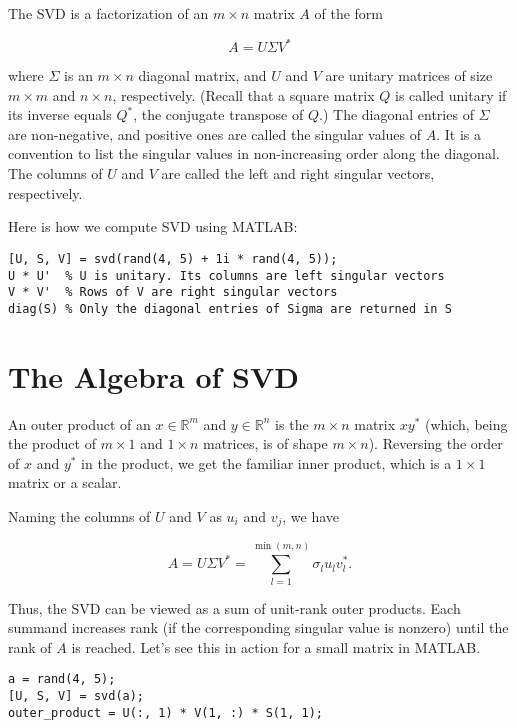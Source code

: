\documentclass{ximera}
\begin{document}
\begin{problem}
\begin{problem}
The SVD is a factorization of an \( m \times n \) matrix \( A \) of the form

\[
A = U \Sigma V^*
\]

where \( \Sigma \) is an \( m \times n \) diagonal matrix, and \( U \) and \( V \) are unitary matrices of size \( m \times m \) and \( n \times n \), respectively. (Recall that a square matrix \( Q \) is called unitary if its inverse equals \( Q^* \), the conjugate transpose of \( Q \).) The diagonal entries of \( \Sigma \) are non-negative, and positive ones are called the singular values of \( A \). It is a convention to list the singular values in non-increasing order along the diagonal. The columns of \( U \) and \( V \) are called the left and right singular vectors, respectively.

Here is how we compute SVD using MATLAB:

\begin{verbatim}
[U, S, V] = svd(rand(4, 5) + 1i * rand(4, 5));
U * U'  % U is unitary. Its columns are left singular vectors
V * V'  % Rows of V are right singular vectors
diag(S) % Only the diagonal entries of Sigma are returned in S
\end{verbatim}

\section{The Algebra of SVD}

An outer product of an \( x \in \mathbb{R}^m \) and \( y \in \mathbb{R}^n \) is the \( m \times n \) matrix \( x y^* \) (which, being the product of \( m \times 1 \) and \( 1 \times n \) matrices, is of shape \( m \times n \)). Reversing the order of \( x \) and \( y^* \) in the product, we get the familiar inner product, which is a \( 1 \times 1 \) matrix or a scalar.

Naming the columns of \( U \) and \( V \) as \( u_i \) and \( v_j \), we have

\[
A = U \Sigma V^* = \sum_{l=1}^{\min(m,n)} \sigma_l u_l v_l^*.
\]

Thus, the SVD can be viewed as a sum of unit-rank outer products. Each summand increases rank (if the corresponding singular value is nonzero) until the rank of \( A \) is reached. Let's see this in action for a small matrix in MATLAB.

\begin{verbatim}
a = rand(4, 5);
[U, S, V] = svd(a);
outer_product = U(:, 1) * V(1, :) * S(1, 1);
\end{verbatim}


\end{problem}
\end{problem}
\end{document}
